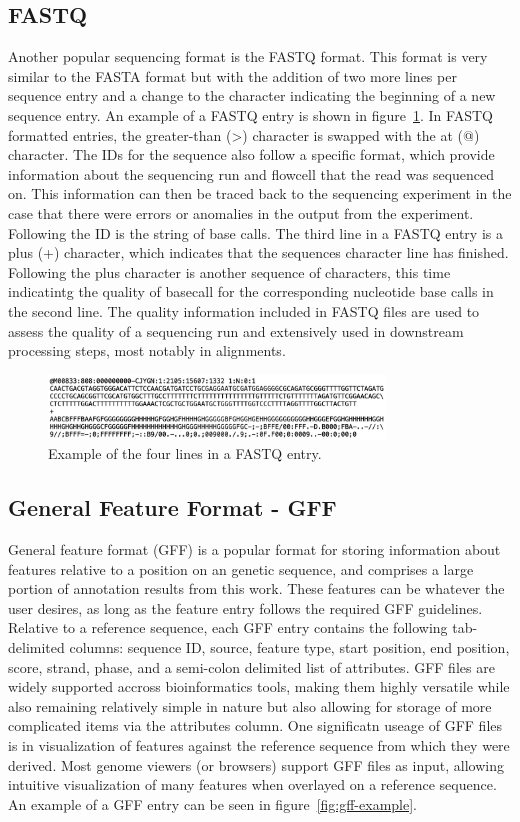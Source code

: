 \subsection{FASTQ}
Another popular sequencing format is the FASTQ format. This format is
very similar to the FASTA format but with the addition of two more
lines per sequence entry and a change to the character indicating the
beginning of a new sequence entry. An example of a FASTQ entry is
shown in figure~\ref{fig:fastq-example}. In FASTQ formatted entries,
the greater-than (\textgreater) character is swapped with the at (@)
character. The IDs for the sequence also follow a specific format,
which provide information about the sequencing run and flowcell that
the read was sequenced on. This information can then be traced back to
the sequencing experiment in the case that there were errors or
anomalies in the output from the experiment. Following the ID is the
string of base calls. The third line in a FASTQ entry is a plus (+)
character, which indicates that the sequences character line has
finished. Following the plus character is another sequence of
characters, this time indicatintg the quality of basecall for the
corresponding nucleotide base calls in the second line. The quality
information included in FASTQ files are used to assess the quality of
a sequencing run and extensively used in downstream processing steps,
most notably in alignments.

\begin{figure}
  \centering
  \includegraphics[width=0.8\textwidth]{figures/fastq-example.png}
  \caption{Example of the four lines in a FASTQ entry.}
  \label{fig:fastq-example}
\end{figure}

\subsection{General Feature Format - GFF}
General feature format (GFF) is a popular format for storing
information about features relative to a position on an genetic
sequence, and comprises a large portion of annotation results from
this work. These features can be whatever the user desires, as long as
the feature entry follows the required GFF guidelines. Relative to a
reference sequence, each GFF entry contains the following
tab-delimited columns: sequence ID, source, feature type, start
position, end position, score, strand, phase, and a semi-colon
delimited list of attributes. GFF files are widely supported accross
bioinformatics tools, making them highly versatile while also
remaining relatively simple in nature but also allowing for storage of
more complicated items via the attributes column. One significatn
useage of GFF files is in visualization of features against the
reference sequence from which they were derived. Most genome viewers
(or browsers) support GFF files as input, allowing intuitive
visualization of many features when overlayed on a reference
sequence. An example of a GFF entry can be seen in
figure~\ref{fig:gff-example}.

